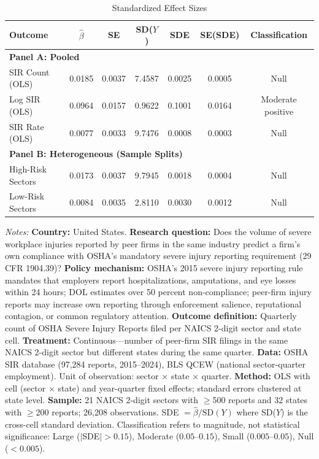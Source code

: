 \begin{table}[t]
\centering
\caption{Standardized Effect Sizes}\label{tab:sde}
\begin{tabular}{lcccccc}
\toprule
Outcome & $\hat{\beta}$ & SE & SD($Y$) & SDE & SE(SDE) & Classification \\
\midrule
\multicolumn{7}{l}{\textbf{Panel A: Pooled}} \\
SIR Count (OLS) & 0.0185 & 0.0037 & 7.4587 & 0.0025 & 0.0005 & Null \\
Log SIR (OLS) & 0.0964 & 0.0157 & 0.9622 & 0.1001 & 0.0164 & Moderate positive \\
SIR Rate (OLS) & 0.0077 & 0.0033 & 9.7476 & 0.0008 & 0.0003 & Null \\
\midrule
\multicolumn{7}{l}{\textbf{Panel B: Heterogeneous (Sample Splits)}} \\
High-Risk Sectors & 0.0173 & 0.0037 & 9.7945 & 0.0018 & 0.0004 & Null \\
Low-Risk Sectors & 0.0084 & 0.0035 & 2.8110 & 0.0030 & 0.0012 & Null \\
\bottomrule
\end{tabular}
\begin{tablenotes}[flushleft]\footnotesize
\item \textit{Notes:} \textbf{Country:} United States. \textbf{Research question:} Does the volume of severe workplace injuries reported by peer firms in the same industry predict a firm's own compliance with OSHA's mandatory severe injury reporting requirement (29 CFR 1904.39)? \textbf{Policy mechanism:} OSHA's 2015 severe injury reporting rule mandates that employers report hospitalizations, amputations, and eye losses within 24 hours; DOL estimates over 50 percent non-compliance; peer-firm injury reports may increase own reporting through enforcement salience, reputational contagion, or common regulatory attention. \textbf{Outcome definition:} Quarterly count of OSHA Severe Injury Reports filed per NAICS 2-digit sector and state cell. \textbf{Treatment:} Continuous---number of peer-firm SIR filings in the same NAICS 2-digit sector but different states during the same quarter. \textbf{Data:} OSHA SIR database (97,284 reports, 2015--2024), BLS QCEW (national sector-quarter employment). Unit of observation: sector $\times$ state $\times$ quarter. \textbf{Method:} OLS with cell (sector $\times$ state) and year-quarter fixed effects; standard errors clustered at state level. \textbf{Sample:} 21 NAICS 2-digit sectors with $\geq$500 reports and 32 states with $\geq$200 reports; 26,208 observations. SDE $= \hat{\beta} / \text{SD}(Y)$ where SD($Y$) is the cross-cell standard deviation. Classification refers to magnitude, not statistical significance: Large ($|$SDE$| > 0.15$), Moderate ($0.05$--$0.15$), Small ($0.005$--$0.05$), Null ($< 0.005$).
\end{tablenotes}
\end{table}

